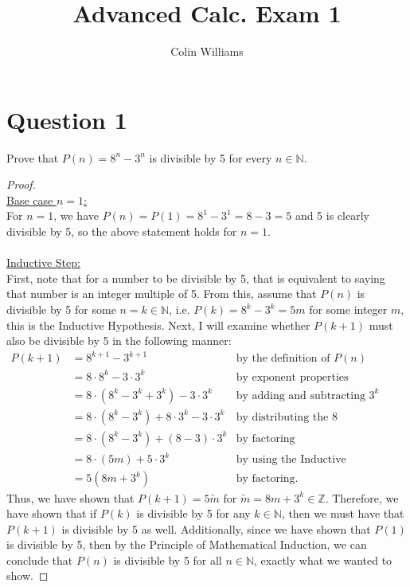 \documentclass[10pt,a4paper]{article}
\title{Advanced Calc. Exam 1}
\author{Colin Williams}
\theoremstyle{definition}
\begin{document}
\maketitle

\section*{Question 1}
Prove that $P(n) = 8^n - 3^n$ is divisible by 5 for every $n \in \mathbb{N}$.

\begin{proof}{$ $}
\\\underline{Base case $n = 1$:}
\\For $n = 1$, we have $P(n) = P(1) = 8^1 - 3^1 = 8 - 3 = 5$ and 5 is clearly divisible by 5, so the above statement holds for $n=1$.
\\
\\\underline{Inductive Step:}
\\First, note that for a number to be divisible by 5, that is equivalent to saying that number is an integer multiple of 5. From this, assume that $P(n)$ is divisible by 5 for some $n = k \in \mathbb{N}$, i.e. $P(k) = 8^k - 3^k = 5m$ for some integer $m$, this is the Inductive Hypothesis. Next, I will examine whether $P(k+1)$ must also be divisible by 5 in the following manner:
\begin{align*}
P(k+1) &= 8^{k+1} - 3^{k+1} &\text{by the definition of } P(n)\\
&= 8\cdot 8^k - 3\cdot 3^k &\text{by exponent properties}\\
&= 8\cdot (8^k - 3^k + 3^k) - 3\cdot 3^k &\text{by adding and subtracting } 3^k\\
&= 8\cdot (8^k - 3^k) + 8\cdot 3^k - 3\cdot 3^k &\text{by distributing the 8}\\
&= 8\cdot (8^k - 3^k) + (8 - 3)\cdot 3^k &\text{by factoring}\\
&= 8\cdot (5m) + 5\cdot 3^k &\text{by using the Inductive Hypothesis}\\
&= 5(8m + 3^k) &\text{by factoring}.
\end{align*}
Thus, we have shown that $P(k+1) = 5\widetilde{m}$ for $\widetilde{m} = 8m + 3^k \in \mathbb{Z}$. Therefore, we have shown that if $P(k)$ is divisible by 5 for any $k \in \mathbb{N}$, then we must have that $P(k+1)$ is divisible by 5 as well. Additionally, since we have shown that $P(1)$ is divisible by 5, then by the Principle of Mathematical Induction, we can conclude that $P(n)$ is divisible by 5 for all $n \in \mathbb{N}$, exactly what we wanted to show.
\end{proof}
\end{document}
